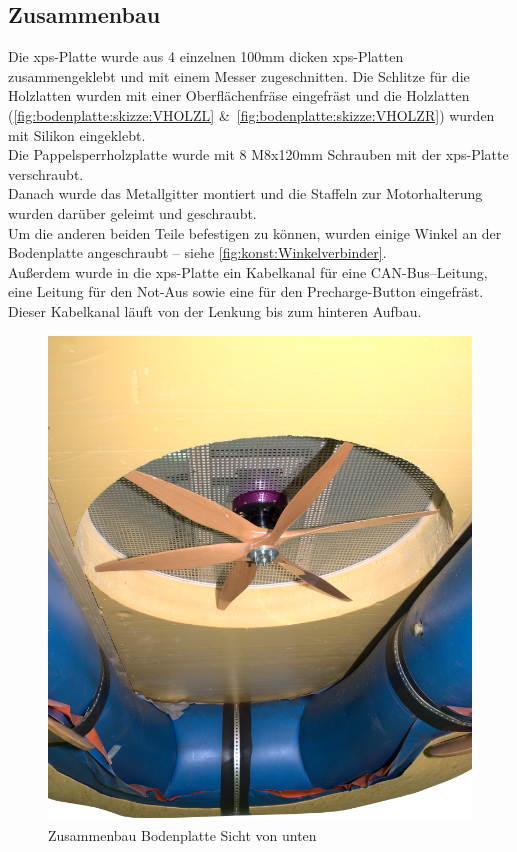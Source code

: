 \subsection{Zusammenbau}
Die \acs{xps}-Platte wurde aus 4 einzelnen 100mm dicken \acs{xps}-Platten zusammengeklebt und mit einem Messer zugeschnitten. Die Schlitze für die Holzlatten wurden mit einer Oberflächenfräse eingefräst und die Holzlatten (\autoref{fig:bodenplatte:skizze:VHOLZL} \&\ \autoref{fig:bodenplatte:skizze:VHOLZR}) wurden mit Silikon eingeklebt.\\
Die Pappelsperrholzplatte wurde mit 8 M8x120mm Schrauben mit der \acs{xps}-Platte verschraubt.\\
Danach wurde das Metallgitter montiert und die Staffeln zur Motorhalterung wurden darüber geleimt und geschraubt.\\
Um die anderen beiden Teile befestigen zu können, wurden einige Winkel an der Bodenplatte angeschraubt -- siehe \autoref{fig:konst:Winkelverbinder}.\\
Außerdem wurde in die \acs{xps}-Platte ein Kabelkanal für eine CAN-Bus--Leitung, eine Leitung für den Not-Aus sowie eine für den Precharge-Button eingefräst. Dieser Kabelkanal läuft von der Lenkung bis zum hinteren Aufbau.
\begin{figure}[H]
    \centering
    \includegraphics[width=.6\textwidth]{Fotos/Konstruktion/DSC_8600.png}
    \caption{Zusammenbau Bodenplatte Sicht von unten}    
\end{figure}

